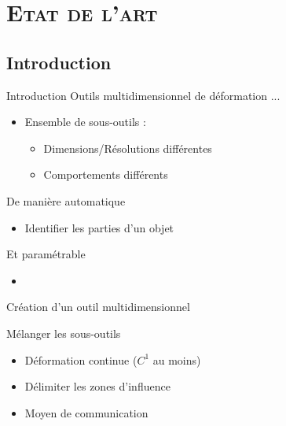 \documentclass[xcolor=x11names,compress]{beamer}
\renewcommand{\(}{\begin{columns}} \renewcommand{\)}{\end{columns}}
\newcommand{\<}[1]{\begin{column}{#1}} \renewcommand{\>}{\end{column}}
\begin{document}
\section{\scshape Etat de l'art}
\subsection{Introduction}

\begin{frame}{Introduction}
  Outils multidimensionnel de déformation ...
  \begin{itemize}
  \item Ensemble de sous-outils :
    \begin{itemize}
    \item Dimensions/Résolutions différentes
    \item Comportements différents
    \end{itemize}
  \end{itemize}
  De manière automatique
  \begin{itemize}
  \item Identifier les parties d'un objet
  \end{itemize}
  Et paramétrable
  \begin{itemize}
  \item
  \end{itemize}
\end{frame}

\begin{frame}{Création d'un outil multidimensionnel}
  \begin{block}{Mélanger les sous-outils}
    \begin{itemize}
    \item Déformation continue ($C^1$ au moins)
    \item Délimiter les zones d'influence
    \item Moyen de communication
    \end{itemize}
  \end{block}
  \begin{alertblock}{}
  \end{alertblock}
\end{frame}
\end{document}
